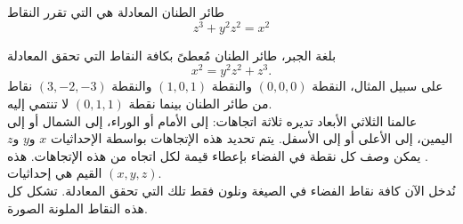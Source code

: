 \begin{surferPage}{طائر الطنان }
المعادلة هي التي تقرر النقاط\\
  
  \smallskip
\[z^3+ y^2	z^2	= x^2\]

\singlespacing
بلغة الجبر، طائر الطنان مُعطىً بكافة النقاط التي تحقق المعادلة
\smallskip
\[ x^2= y^2z^2+z^3.\]
\smallskip
على سبيل المثال، النقطة
 $(0,0,0)$
  والنقطة  
  $(1,0,1)$
   والنقطة
 $(3,-2,-3)$ 
     نقاط من طائر الطنان بينما نقطة
     $(0,1,1)$
      لا تنتمي إليه.\\
 \singlespacing
عالمنا الثلاثي الأبعاد تديره ثلاثة اتجاهات: إلى الأمام أو الوراء، إلى الشمال أو إلى اليمين، إلى الأعلى أو إلى الأسفل. يتم تحديد هذه الإتجاهات بواسطة الإحداثيات $x$ و$y$ و$z$. يمكن وصف كل نقطة في الفضاء بإعطاء قيمة لكل اتجاه من هذه الإتجاهات. هذه القيم هي إحداثيات
 $(x,y,z)$.
  \\
\singlespacing
نُدخل الآن كافة نقاط الفضاء في الصيغة ونلون فقط تلك التي تحقق المعادلة. تشكل كل هذه النقاط الملونة الصورة.
\end{surferPage}

